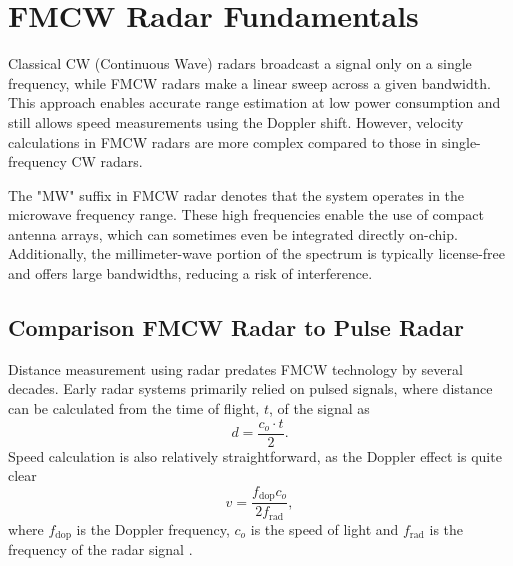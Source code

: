 \def\PageLayout{single-no-print}
\def\DocLanguage{en}
\def\PackagesIncludeTikz{yes}
\def\PackagesIncludeBib{yes}









\usepackage{pdfpages}

\newcommand{\sirad}{SiRad Easy\textsuperscript{\copyright} }
\newcommand{\boldred}[1]{\textbf{\textcolor{red}{#1}}}
\newcommand{\boldblue}[1]{\textbf{\textcolor{blue}{#1}}}






\tableofcontents

\newpage
{}
\setcounter{page}{1}





\pagestyle{fancy}

\chapter{FMCW Radar Fundamentals}

Classical CW (Continuous Wave) radars broadcast a signal only on a single frequency, while FMCW radars make a linear sweep across a given bandwidth.
This approach enables accurate range estimation at low power consumption and still allows speed measurements using the Doppler shift.
However, velocity calculations in FMCW radars are more complex compared to those in single-frequency CW radars.

The "MW" suffix in FMCW radar denotes that the system operates in the microwave frequency range.
These high frequencies enable the use of compact antenna arrays, which can sometimes even be integrated directly on-chip.
Additionally, the millimeter-wave portion of the spectrum is typically license-free \cite{spektrumCTU} and offers large bandwidths, reducing a risk of interference.

\section{Comparison FMCW Radar to Pulse Radar}

Distance measurement using radar predates FMCW technology by several decades.
Early radar systems primarily relied on pulsed signals, where distance can be calculated from the time of flight, $t$, of the signal as
\begin{equation}
  d = \frac{c_o \cdot t}{2}.
  \label{eq:distance}
\end{equation}
Speed calculation is also relatively straightforward, as the Doppler effect is quite clear
\begin{equation}
  v = \frac{f_\mathrm{dop} c_o}{2f_\mathrm{rad}},
  \label{eq:dopler}
\end{equation}
where $f_\mathrm{dop}$ is the Doppler frequency, $c_o$ is the speed of light and $f_\mathrm{rad}$ is the frequency of the radar signal \cite{jankiraman2018}.


